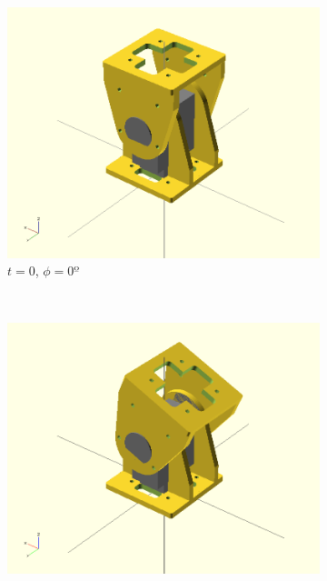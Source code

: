 \begin{figure}[h]
		\centering
        \begin{subfigure}[b]{0.18\textwidth}
                \centering
                \includegraphics[width=\textwidth]{images/Gait_osc_center_90.png}
                \caption{$t = 0$, $\phi=0º$}
                \label{fig:Gait_osc_center_90}
        \end{subfigure}
        ~
        \begin{subfigure}[b]{0.18\textwidth}
                \centering
                \includegraphics[width=\textwidth]{images/Gait_osc_center_112_5.png}

\end{subfigure}
\end{figure}
